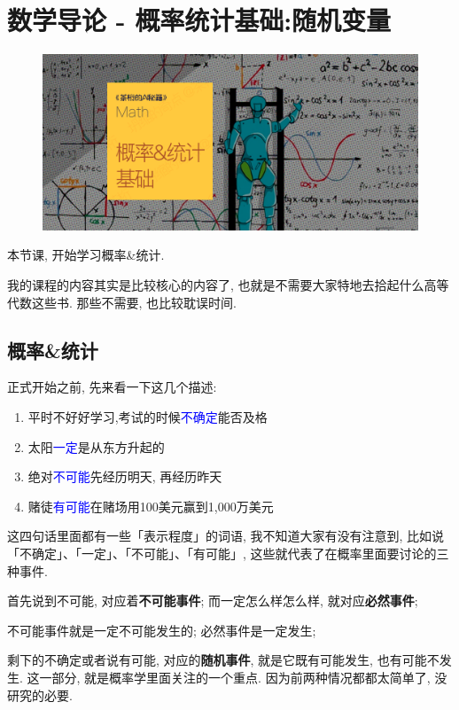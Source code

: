 \chapter{数学导论 - 概率统计基础:随机变量}
\begin{figure}[ht]
  \centering
  \includegraphics[width=1\textwidth]{asset/茶桁的AI秘籍_Math_4.png}
\end{figure}
\newpage

本节课, 开始学习概率\&统计. 

我的课程的内容其实是比较核心的内容了, 也就是不需要大家特地去拾起什么高等代数这些书. 那些不需要, 也比较耽误时间. 

\section{概率\&统计}

正式开始之前, 先来看一下这几个描述:

\begin{enumerate}
  \item 平时不好好学习,考试的时候\textcolor{blue}{不确定}能否及格
  \item 太阳\textcolor{blue}{一定}是从东方升起的
  \item 绝对\textcolor{blue}{不可能}先经历明天, 再经历昨天
  \item 赌徒\textcolor{blue}{有可能}在赌场用100美元赢到1,000万美元
\end{enumerate}

这四句话里面都有一些「表示程度」的词语, 我不知道大家有没有注意到, 比如说「不确定」、「一定」、「不可能」、「有可能」, 这些就代表了在概率里面要讨论的三种事件. 

首先说到不可能, 对应着\textbf{不可能事件}; 而一定怎么样怎么样, 就对应\textbf{必然事件}; 

不可能事件就是一定不可能发生的; 必然事件是一定发生; 

剩下的不确定或者说有可能, 对应的\textbf{随机事件}, 就是它既有可能发生, 也有可能不发生. 这一部分, 就是概率学里面关注的一个重点. 因为前两种情况都都太简单了, 没研究的必要. 

